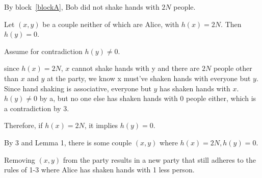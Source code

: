 \documentclass[11pt]{article}
\begin{document}
\begin{enumerate}
\begin{enumerate}
\begin{longFormProof}
\begin{block}[blockA]
       \end{block}

       \step By block~\ref{blockA}, Bob did not shake hands with $2N$ people.
       
       \smallskip
       \hrulefill
       \smallskip
       
             \begin{lemma}
               Let $(x,y)$ be a couple neither of which are Alice, with $h(x)=2N$.  Then $h(y)=0$.
             \end{lemma}
       
             \begin{longFormProof}
               \begin{block}[blockL]
                  {Assume for contradiction $h(y) \neq 0$.}

                  \step since $h(x) = 2N$, $x$ cannot shake hands with y and there are $2N$ 
                        people other than $x$ and $y$ at the party, we know x must’ve shaken 
                        hands with everyone but $y$.
                  \step Since hand shaking is associative, everyone but $y$ has shaken hands with $x$.
                  \step $h(y) \neq 0$ by a, but no one else has shaken hands with 0 people 
                        either, which is a contradiction by 3.
               \end{block}
                \step Therefore, if $h(x) = 2N$, it implies $h(y) = 0$.
             \end{longFormProof}
       
       \vspace*{-1em}
       \hrulefill
       \smallskip
       
       \step By 3 and Lemma 1, there is some couple $(x,y)$ where $h(x)=2N, h(y)=0$.

      \smallskip
       \hrulefill
       \smallskip
       
             \begin{lemma}
               Removing $(x,y)$ from the party results in a new party that still adheres to the rules of 1-3 where Alice has shaken hands with 1 less person.
             \end{lemma}
       

\end{longFormProof}
\end{enumerate}
\end{enumerate}
\end{document}
